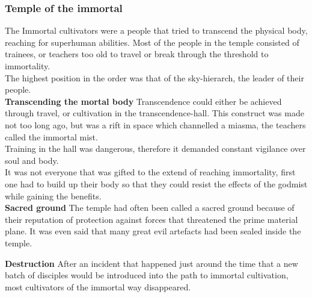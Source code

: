 \documentclass[a4paper]{article}
\begin{document}
\subsubsection{Temple of the immortal}
The Immortal cultivators were a people that tried to transcend the physical body, reaching for superhuman abilities. Most of the people in the temple consisted of trainees, or teachers too old to travel or break through the threshold to immortality.
\\
The highest position in the order was that of the sky-hierarch, the leader of their people.
\\
\textbf{Transcending the mortal body}
Transcendence could either be achieved through travel, or cultivation in the transcendence-hall. This construct was made not too long ago, but was a rift in space which channelled a miasma, the teachers called the immortal mist.
\\ Training in the hall was dangerous, therefore it demanded constant vigilance over soul and body.
\\ It was not everyone that was gifted to the extend of reaching immortality, first one had to build up their body so that they could resist the effects of the godmist while gaining the benefits.
\\
\textbf{Sacred ground}
The temple had often been called a sacred ground because of their reputation of protection against forces that threatened the prime material plane. It was even said that many great evil artefacts had been sealed inside the temple.

\textbf{Destruction}
After an incident that happened just around the time that a new batch of disciples would be introduced into the path to immortal cultivation, most cultivators of the immortal way disappeared.
\end{document}

